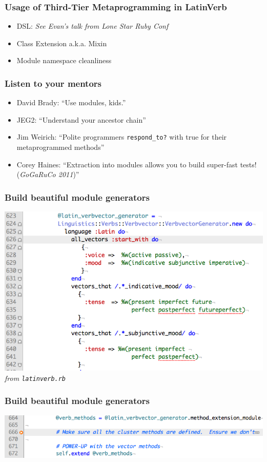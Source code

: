 \documentclass[slidestop,compress,mathserif]{beamer}
\begin{document}
\begin{frame}
	\frametitle{Usage of Third-Tier Metaprogramming in LatinVerb}
	\begin{itemize}
		\item DSL:  \emph{See Evan's talk from Lone Star Ruby Conf}
		\item Class Extension a.k.a. Mixin
		\item Module namespace cleanliness
	\end{itemize}
\end{frame}

\begin{frame}
	\frametitle{Listen to your mentors}
	\begin{itemize}
		\item David Brady:  ``Use modules, kids.''
		\item JEG2:  ``Understand your ancestor chain''
		\item Jim Weirich:  ``Polite programmers \texttt{respond\_to?} with true for their metaprogrammed methods''
		\item Corey Haines:  ``Extraction into modules allows you to build super-fast tests! (\emph{GoGaRuCo 2011})''
	\end{itemize}
\end{frame}

\begin{frame}
	\frametitle{Build beautiful module generators}
	\begin{center}
		\includegraphics[scale=0.35]{img/ll_dsl.png} \\
		\emph{from \texttt{latinverb.rb}}
	\end{center}	
\end{frame}

\begin{frame}
	\frametitle{Build beautiful module generators}
	\begin{center}
		\includegraphics[scale=0.35]{img/ll_mod_inc.png}
	\end{center}	
\end{frame}
\end{document}
